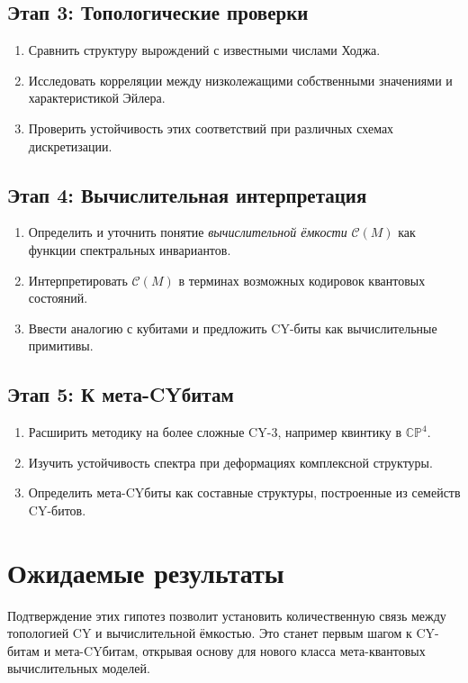 \documentclass[12pt,a4paper]{article}
\begin{document}
\subsection{Этап 3: Топологические проверки}
\begin{enumerate}
\item Сравнить структуру вырождений с известными числами Ходжа.  
\item Исследовать корреляции между низколежащими собственными значениями 
и характеристикой Эйлера.  
\item Проверить устойчивость этих соответствий 
при различных схемах дискретизации.  
\end{enumerate}

\subsection{Этап 4: Вычислительная интерпретация}
\begin{enumerate}
\item Определить и уточнить понятие \emph{вычислительной ёмкости} $\mathcal{C}(M)$ 
как функции спектральных инвариантов.  
\item Интерпретировать $\mathcal{C}(M)$ в терминах возможных кодировок квантовых состояний.  
\item Ввести аналогию с кубитами и предложить CY-биты 
как вычислительные примитивы.  
\end{enumerate}

\subsection{Этап 5: К мета-CYбитам}
\begin{enumerate}
\item Расширить методику на более сложные CY-3, 
например квинтику в $\mathbb{CP}^4$.  
\item Изучить устойчивость спектра при деформациях комплексной структуры.  
\item Определить мета-CYбиты как составные структуры, построенные из семейств CY-битов.  
\end{enumerate}

\section{Ожидаемые результаты}
Подтверждение этих гипотез позволит установить количественную связь 
между топологией CY и вычислительной ёмкостью. 
Это станет первым шагом к CY-битам и мета-CYбитам, 
открывая основу для нового класса мета-квантовых вычислительных моделей.  
\end{document}
